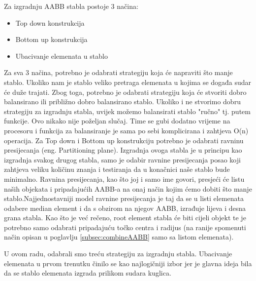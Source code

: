 Za izgradnju AABB stabla postoje 3 načina\cite{3}: 
\begin{itemize}
	\item Top down konstrukcija
	\item Bottom up konstrukcija
	\item Ubacivanje elemenata u stablo
\end{itemize}
Za sva 3 načina, potrebno je odabrati strategiju koja će napraviti što manje stablo. Ukoliko nam je stablo veliko pretraga elemenata u kojima se događa sudar će duže trajati. Zbog toga, potrebno je odabrati strategiju koja će stvoriti dobro balansirano ili približno dobro balansirano stablo\cite{1}. Ukoliko i ne stvorimo dobru strategiju za izgradnju stabla, uvijek možemo balansirati stablo "ručno" tj. putem funkcije. Ovo nikako nije poželjan slučaj. Time se gubi dodatno vrijeme na procesoru i funkcija za balansiranje je sama po sebi komplicirana i zahtjeva O(n) operacija. Za Top down i Bottom up konstrukciju potrebno je odabrati ravninu presijecanja (eng. Partitioning plane). Izgradnja ovoga stabla je u principu kao izgradnja svakog drugog stabla, samo je odabir ravnine presijecanja posao koji zahtjeva veliku količinu znanja i testiranja da u konačnici naše stablo bude minimalno. 
Ravnina presijecanja, kao što joj i samo ime govori, presjeći će listu naših objekata i pripadajućih AABB-a na onaj način kojim ćemo dobiti što manje stablo.Najjednostavniji model ravnine presijecanja je taj da se u listi elemenata odabere median element i da s obzirom na njegov AABB, izrađuje lijeva i desna grana stabla. Kao što je već rečeno, root element stabla će biti cijeli objekt te je potrebno samo odabrati pripadajuću točko centra i radijus (na ranije spomenuti način opisan u poglavlju \ref{subsec:combineAABB} samo sa listom elemenata).

U ovom radu, odabrali smo treću strategiju za izgradnju stabla. Ubacivanje elemenata u prvom trenutku činilo se kao najlogičniji izbor jer je glavna ideja bila da se stablo elemenata izgrada prilikom sudara kuglica.

